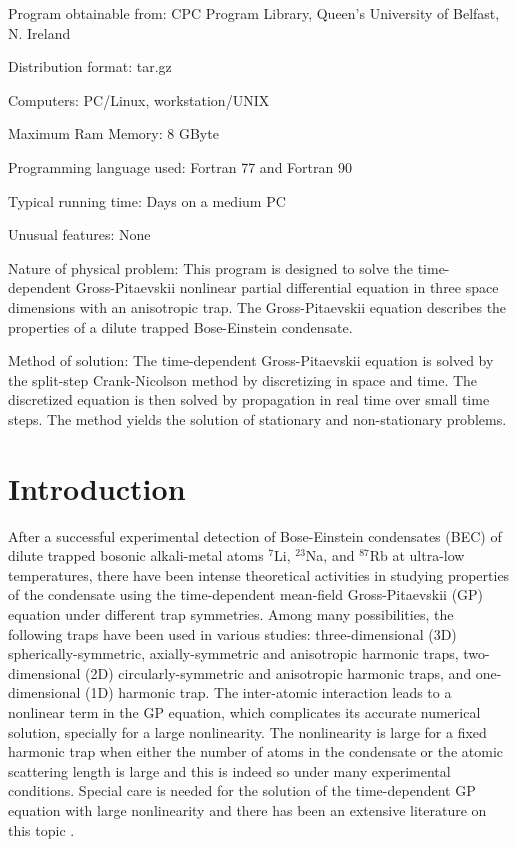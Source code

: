 \documentclass[onecolumn]{elsart3p}
\begin{document}
Program obtainable from: CPC Program Library, Queen's University of 
Belfast, N. Ireland

Distribution format: tar.gz

Computers: PC/Linux, workstation/UNIX

Maximum Ram Memory: 8 GByte

Programming language used: Fortran 77 and Fortran 90




Typical running time: Days on a medium PC

Unusual features: None

Nature of physical problem: This program is designed to solve the
time-dependent Gross-Pitaevskii nonlinear partial differential equation
in three space dimensions with an anisotropic trap. The Gross-Pitaevskii
equation describes the properties of a dilute trapped Bose-Einstein
condensate.


Method of solution: The time-dependent Gross-Pitaevskii equation is
solved by the split-step Crank-Nicolson method by discretizing in space
and time. The discretized equation is then solved by propagation in real
time over small time steps.  The method yields the solution of
stationary and non-stationary problems. 



\section{Introduction}

After a successful experimental detection of Bose-Einstein condensates (BEC) of
dilute trapped bosonic alkali-metal atoms $^7$Li, $^{23}$Na, and $^{87}$Rb
\cite{review,books} at ultra-low temperatures, there have been intense
theoretical activities in studying properties of the condensate using the
time-dependent mean-field Gross-Pitaevskii (GP) equation under different trap
symmetries. Among many possibilities, the following traps have been used in
various studies: three-dimensional (3D) spherically-symmetric, axially-symmetric
and anisotropic harmonic traps, two-dimensional (2D) circularly-symmetric and
anisotropic harmonic traps, and one-dimensional (1D) harmonic trap. The
inter-atomic interaction leads to a nonlinear term in the GP equation, which
complicates its accurate numerical solution, specially for a large nonlinearity.
The nonlinearity is large for a fixed harmonic trap when either the number of
atoms in the condensate or the atomic scattering length is large and this is
indeed so under  many experimental conditions. Special care is needed 
for the
solution of the time-dependent GP equation with large nonlinearity and there has
been an extensive literature on this topic
\cite{Tiwari_Shukla,Bao_Tang,Schneider_Feder,chio1,chio2,chang,num1,num2,num3,num4,num5,num6,num7,num8,num9,num10,num11,num12,num13,num14,num15,num16,num17,num18,num19,num20,num21,num22,num23,num24,num25,num26,num27,num28,num29,num30,num31,num32,num33,num34,num35,aq,xyz1,burnett,holland,baer}.
\end{document}
